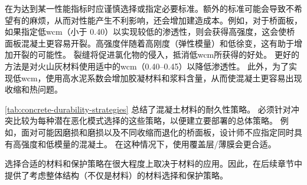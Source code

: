 在为达到某一性能指标时应谨慎选择或指定必要标准。额外的标准可能会导致不希望有的麻烦，从而对性能产生不利影响，还会增加建造成本。例如，对于桥面板，如果指定低\acrlong*{wcm}（小于 0.40）以实现较低的渗透性，则会获得高强度，这会使桥面板混凝土更容易开裂。高强度伴随着高刚度（弹性模量）和低徐变，这有助于增加开裂的可能性。 裂缝将促进氯化物的侵入，抵消低\acrlong*{wcm}所获得的好处。 更好的方法是对火山灰材料使用适中的\acrlong*{wcm}（\numrange{0.40}{0.45}）以降低渗透性。 此外，为了实现低\acrlong*{wcm}，使用高水泥系数会增加胶凝材料和浆料含量，从而使混凝土更容易出现收缩和热问题。

\cref{tab:concrete-durability-strategies} 总结了混凝土材料的耐久性策略。 必须针对冲突比较为每种潜在恶化模式选择的这些策略，以便建立要部署的总体策略。 例如，面对可能因磨损和磨损以及不同收缩而退化的桥面板，设计师不应指定同时具有高强度和低模量的混凝土。 在这种情况下，使用覆盖层/薄膜会更合适。

选择合适的材料和保护策略在很大程度上取决于材料的应用。因此，在后续章节中提供了考虑整体结构（不仅是材料）的材料选择和保护策略。

